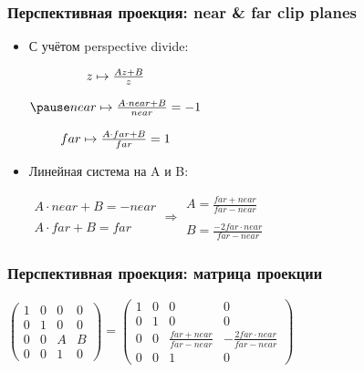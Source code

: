 \documentclass{beamer}
\begin{document}
\begin{frame}[fragile]
\frametitle{Перспективная проекция: near \& far clip planes}
\begin{itemize}
\item С учётом perspective divide:
\begin{center}
\begin{math}
\begin{matrix}
z \mapsto \frac{Az + B}{z} \\ \\
\pause
near \mapsto \frac{A\cdot near + B}{near} = -1 \\ \\
far \mapsto \frac{A\cdot far + B}{far} = 1
\end{matrix}
\end{math}
\end{center}
\pause
\item Линейная система на A и B:
\begin{center}
\begin{math}
\begin{matrix}
A \cdot near + B = -near \\ \\
A \cdot far + B = far
\end{matrix}
\Rightarrow
\begin{matrix}
A = \frac{far + near}{far - near} \\ \\
B = \frac{-2 far \cdot near}{far - near}
\end{matrix}
\end{math}
\end{center}
\end{itemize}
\end{frame}

\begin{frame}[fragile]
\frametitle{Перспективная проекция: матрица проекции}
\begin{center}
\begin{math}
\begin{pmatrix}
1 & 0 & 0 & 0 \\
0 & 1 & 0 & 0 \\
0 & 0 & A & B \\
0 & 0 & 1 & 0
\end{pmatrix}
=
\begin{pmatrix}
1 & 0 & 0 & 0 \\
0 & 1 & 0 & 0 \\
0 & 0 & \frac{far + near}{far - near} & -\frac{2 far \cdot near}{far - near} \\
0 & 0 & 1 & 0
\end{pmatrix}
\end{math}
\end{center}
\end{frame}
\end{document}
